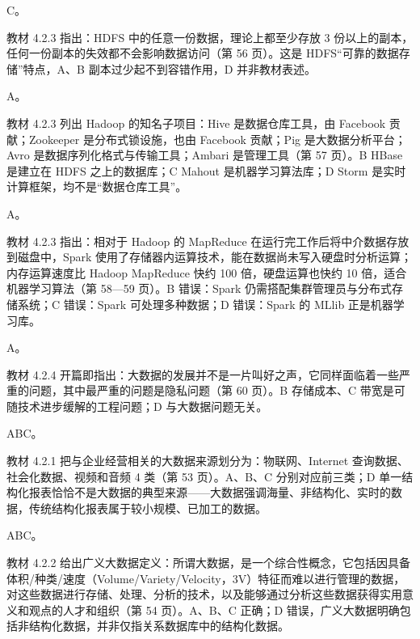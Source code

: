 \documentclass[a4paper,11pt]{article}
\begin{document}
\q C。\begin{analysis}教材 4.2.3 指出：HDFS 中的任意一份数据，理论上都至少存放 3 份以上的副本，任何一份副本的失效都不会影响数据访问（第 56 页）。这是 HDFS“可靠的数据存储”特点，A、B 副本过少起不到容错作用，D 并非教材表述。\end{analysis}

\q A。\begin{analysis}教材 4.2.3 列出 Hadoop 的知名子项目：Hive 是数据仓库工具，由 Facebook 贡献；Zookeeper 是分布式锁设施，也由 Facebook 贡献；Pig 是大数据分析平台；Avro 是数据序列化格式与传输工具；Ambari 是管理工具（第 57 页）。B HBase 是建立在 HDFS 之上的数据库；C Mahout 是机器学习算法库；D Storm 是实时计算框架，均不是“数据仓库工具”。\end{analysis}

\q A。\begin{analysis}教材 4.2.3 指出：相对于 Hadoop 的 MapReduce 在运行完工作后将中介数据存放到磁盘中，Spark 使用了存储器内运算技术，能在数据尚未写入硬盘时分析运算；内存运算速度比 Hadoop MapReduce 快约 100 倍，硬盘运算也快约 10 倍，适合机器学习算法（第 58—59 页）。B 错误：Spark 仍需搭配集群管理员与分布式存储系统；C 错误：Spark 可处理多种数据；D 错误：Spark 的 MLlib 正是机器学习库。\end{analysis}

\q A。\begin{analysis}教材 4.2.4 开篇即指出：大数据的发展并不是一片叫好之声，它同样面临着一些严重的问题，其中最严重的问题是隐私问题（第 60 页）。B 存储成本、C 带宽是可随技术进步缓解的工程问题；D 与大数据问题无关。\end{analysis}


\q ABC。\begin{analysis}教材 4.2.1 把与企业经营相关的大数据来源划分为：物联网、Internet 查询数据、社会化数据、视频和音频 4 类（第 53 页）。A、B、C 分别对应前三类；D 单一结构化报表恰恰不是大数据的典型来源——大数据强调海量、非结构化、实时的数据，传统结构化报表属于较小规模、已加工的数据。\end{analysis}

\q ABC。\begin{analysis}教材 4.2.2 给出广义大数据定义：所谓大数据，是一个综合性概念，它包括因具备体积/种类/速度（Volume/Variety/Velocity，3V）特征而难以进行管理的数据，对这些数据进行存储、处理、分析的技术，以及能够通过分析这些数据获得实用意义和观点的人才和组织（第 54 页）。A、B、C 正确；D 错误，广义大数据明确包括非结构化数据，并非仅指关系数据库中的结构化数据。\end{analysis}
\end{document}
